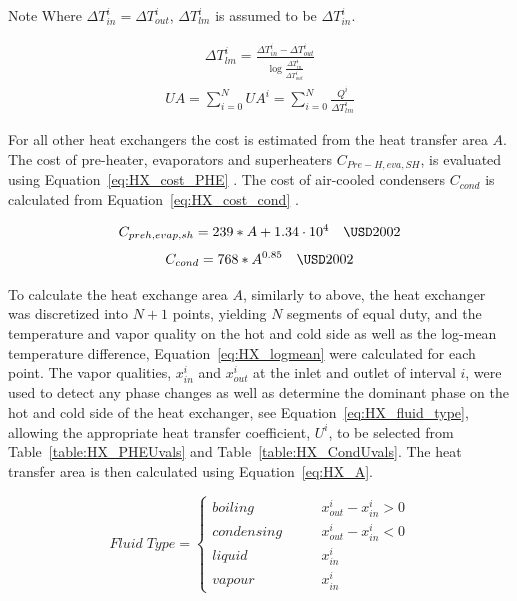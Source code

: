         \begin{notes}{Note}
            Where \(\Delta T_{in}^i=\Delta T_{out}^i\), \(\Delta T_{lm}^i\) is assumed to be \(\Delta T_{in}^i\).
        \end{notes}

        \begin{align}
            \Delta T_{lm}^i= \frac{\Delta T_{in}^i - \Delta T_{out}^i}{\log \frac{\Delta T_{in}^i}{\Delta T_{out}^i}} \label{eq:HX_logmean}
        \end{align}
        \begin{align}
            UA = \sum_{i=0}^N UA^i = \sum_{i=0}^N \frac{Q^i}{\Delta T_{lm}^i} \label{eq:HX_UA}
        \end{align}

        For all other heat exchangers the cost is estimated from the heat transfer area \(A\). The cost of pre-heater, evaporators and superheaters \(C_{Pre-H, eva, SH}\), is evaluated using Equation~\ref{eq:HX_cost_PHE} \cite{Peters2003}. The cost of air-cooled condensers \(C_{cond}\) is calculated from Equation~\ref{eq:HX_cost_cond} \cite{GETEM2016}.

        \begin{align}
            C_{preh, evap, sh}= 239*A + 1.34\cdot 10^4 \quad  \textup{\unit{\USD}}2002 \label{eq:HX_cost_PHE}
        \end{align}
        \begin{align}
            C_{cond} = 768*A^{0.85} \quad  \textup{\unit{\USD}}2002 \label{eq:HX_cost_cond}
        \end{align}

        To calculate the heat exchange area \(A\), similarly to above, the heat exchanger was discretized into \(N+1\) points, yielding \(N\) segments of equal duty, and the temperature and vapor quality on the hot and cold side as well as the log-mean temperature difference, Equation~\ref{eq:HX_logmean} were calculated for each point. The vapor qualities, \(x_{in}^i\) and \(x_{out}^i\) at the inlet and outlet of interval \(i\), were used to detect any phase changes as well as determine the dominant phase on the hot and cold side of the heat exchanger, see Equation~\ref{eq:HX_fluid_type}, allowing the appropriate heat transfer coefficient, \(U^i\), to be selected from Table~\ref{table:HX_PHEUvals} and Table~\ref{table:HX_CondUvals}. The heat transfer area is then calculated using Equation~\ref{eq:HX_A}.

        \begin{equation}
            \label{eq:HX_fluid_type}
            Fluid\;Type = \left\{
            \begin{aligned}
                boiling \quad & \quad x_{out}^i - x_{in}^i > 0\\
                condensing \quad & \quad x_{out}^i - x_{in}^i < 0\\
                liquid \quad & \quad x_{in}^i \\
                vapour \quad & \quad x_{in}^i
            \end{aligned}
            \right.
        \end{equation}
        
